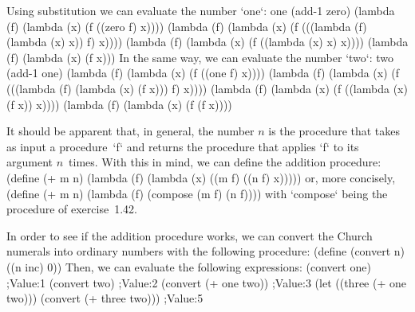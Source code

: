 Using substitution we can evaluate the number `one`:
\begtt\scm
one
(add-1 zero)
(lambda (f) (lambda (x) (f ((zero f) x))))
(lambda (f) (lambda (x) (f (((lambda (f) (lambda (x) x)) f) x))))
(lambda (f) (lambda (x) (f ((lambda (x) x) x))))
(lambda (f) (lambda (x) (f x)))
\endtt
In the same way, we can evaluate the number `two`:
\begtt\scm
two
(add-1 one)
(lambda (f) (lambda (x) (f ((one f) x))))
(lambda (f) (lambda (x) (f (((lambda (f) (lambda (x) (f x))) f) x))))
(lambda (f) (lambda (x) (f ((lambda (x) (f x)) x))))
(lambda (f) (lambda (x) (f (f x))))
\endtt

It should be apparent that, in general, the number $n$ is the procedure that takes as input a procedure~`f` and returns the procedure that applies `f` to its argument $n$~times.
With this in mind, we can define the addition procedure:
\begtt\scm
(define (+ m n)
  (lambda (f) (lambda (x) ((m f) ((n f) x)))))
\endtt
or, more concisely,
\begtt\scm
(define (+ m n)
  (lambda (f) (compose (m f) (n f))))
\endtt
with `compose` being the procedure of exercise~1.42.

In order to see if the addition procedure works, we can convert the Church numerals into ordinary numbers with the following procedure:
\begtt\scm
(define (convert n)
  ((n inc) 0))
\endtt
Then, we can evaluate the following expressions:
\begtt\scm
(convert one)
;Value:1
(convert two)
;Value:2
(convert (+ one two))
;Value:3
(let ((three (+ one two)))
  (convert (+ three two)))
;Value:5
\endtt

